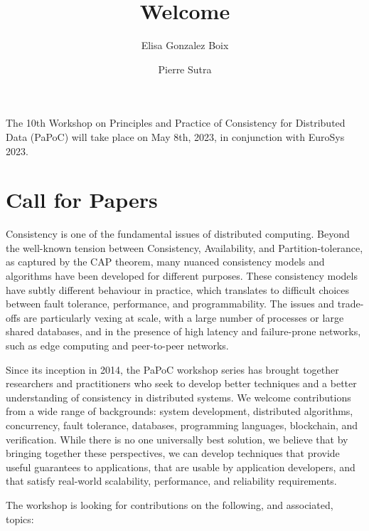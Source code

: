 \documentclass[sigplan,review]{acmart}
\begin{document}
\title{Welcome}
\author{Elisa Gonzalez Boix}
\author{Pierre Sutra}
\maketitle

The 10th Workshop on Principles and Practice of Consistency for Distributed Data (PaPoC) will take place on May 8th, 2023, in conjunction with EuroSys 2023.

\section*{Call for Papers}

Consistency is one of the fundamental issues of distributed computing. 
Beyond the well-known tension between Consistency, Availability, and Partition-tolerance, as captured by the CAP theorem, many nuanced consistency models and algorithms have been developed for different purposes. 
These consistency models have subtly different behaviour in practice, which translates to difficult choices between fault tolerance, performance, and programmability.
The issues and trade-offs are particularly vexing at scale, with a large number of processes or large shared databases, and in the presence of high latency and failure-prone networks, such as edge computing and peer-to-peer networks.

Since its inception in 2014, the PaPoC workshop series has brought together researchers and practitioners who seek to develop better techniques and a better understanding of consistency in distributed systems. 
We welcome contributions from a wide range of backgrounds: system development, distributed algorithms, concurrency, fault tolerance, databases, programming languages, blockchain, and verification. 
While there is no one universally best solution, we believe that by bringing together these perspectives, we can develop techniques that provide useful guarantees to applications, that are usable by application developers, and that satisfy real-world scalability, performance, and reliability requirements.

The workshop is looking for contributions on the following, and associated, topics:
\end{document}

